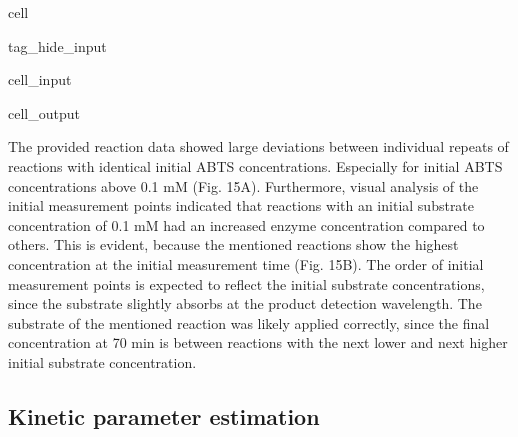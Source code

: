 \documentclass[letterpaper,12pt,english]{jupyterBook}
\begin{document}
\begin{sphinxuseclass}{cell}
\begin{sphinxuseclass}{tag_hide_input}
\begin{sphinxVerbatimInput}
\begin{sphinxuseclass}{cell_input}
\begin{sphinxVerbatim}[commandchars=\\\{\}]
\end{sphinxVerbatim}

\end{sphinxuseclass}\end{sphinxVerbatimInput}
\begin{sphinxVerbatimOutput}

\begin{sphinxuseclass}{cell_output}
\noindent{}

\end{sphinxuseclass}\end{sphinxVerbatimOutput}

\end{sphinxuseclass}
\end{sphinxuseclass}
\sphinxAtStartPar
{}

\sphinxAtStartPar
The provided reaction data showed large deviations between individual repeats of reactions with identical initial ABTS concentrations. Especially for initial ABTS concentrations above 0.1 mM (Fig. 15A).
Furthermore, visual analysis of the initial measurement points indicated that reactions with an initial substrate concentration of 0.1 mM had an increased enzyme concentration compared to others. This is evident, because the mentioned reactions show the highest concentration at the initial measurement time (Fig. 15B). The order of initial measurement points is expected to reflect the initial substrate concentrations, since the substrate slightly absorbs at the product detection wavelength. The substrate of the mentioned reaction was likely applied correctly, since the final concentration at 70 min is between reactions with the next lower and next higher initial substrate concentration.


\subsection{Kinetic parameter estimation}
\label{\detokenize{scenarios/enzyme_inactivation:kinetic-parameter-estimation}}
\end{document}

